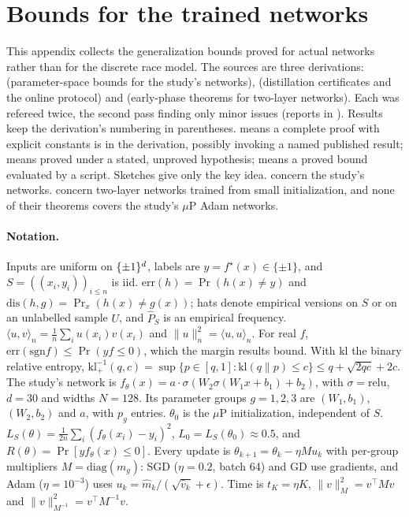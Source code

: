 \section{Bounds for the trained networks}\label{app:networks}

{\sloppy
This appendix collects the generalization bounds proved for actual networks rather than for the discrete race model. The sources are three derivations:
 (parameter-space bounds for the study's networks),
 (distillation certificates and the online protocol) and
 (early-phase theorems for two-layer networks).
Each was refereed twice, the second pass finding only minor issues (reports in ). Results keep the derivation's numbering in parentheses.  means a complete proof with explicit constants is in the derivation, possibly invoking a named published result;  means proved under a stated, unproved hypothesis;  means a proved bound evaluated by a script. Sketches give only the key idea.
 concern the study's networks.  concern two-layer networks trained from small initialization, and none of their theorems covers the study's $\mu$P Adam networks.\par}

\paragraph{Notation.} Inputs are uniform on $\{\pm1\}^d$, labels are $y=f^\star(x)\in\{\pm1\}$, and $S=((x_i,y_i))_{i\le n}$ is iid. $\mathrm{err}(h)=\Pr(h(x)\ne y)$ and $\mathrm{dis}(h,g)=\Pr_x(h(x)\ne g(x))$; hats denote empirical versions on $S$ or on an unlabelled sample $U$, and $\widehat P_S$ is an empirical frequency. $\langle u,v\rangle_n=\frac1n\sum_iu(x_i)v(x_i)$ and $\|u\|_n^2=\langle u,u\rangle_n$. For real $f$, $\mathrm{err}(\mathrm{sgn}f)\le\Pr(yf\le0)$, which the margin results bound. With $\mathrm{kl}$ the binary relative entropy, $\mathrm{kl}^{-1}_+(q,c)=\sup\{p\in[q,1]:\mathrm{kl}(q\|p)\le c\}\le q+\sqrt{2qc}+2c$.
The study's network is $f_\theta(x)=a\cdot\sigma(W_2\sigma(W_1x+b_1)+b_2)$, with $\sigma=\mathrm{relu}$, $d=30$ and widths $N=128$. Its parameter groups $g=1,2,3$ are $(W_1,b_1)$, $(W_2,b_2)$ and $a$, with $p_g$ entries. $\theta_0$ is the $\mu$P initialization, independent of $S$. $L_S(\theta)=\frac1{2n}\sum_i(f_\theta(x_i)-y_i)^2$, $L_0=L_S(\theta_0)\approx0.5$, and $R(\theta)=\Pr[yf_\theta(x)\le0]$. Every update is $\theta_{k+1}=\theta_k-\eta Mu_k$ with per-group multipliers $M=\mathrm{diag}(m_g)$: SGD ($\eta=0.2$, batch 64) and GD use gradients, and Adam ($\eta=10^{-3}$) uses $u_k=\hat m_k/(\sqrt{\hat v_k}+\epsilon)$. Time is $t_K=\eta K$, $\|v\|_M^2=v^\top Mv$ and $\|v\|^2_{M^{-1}}=v^\top M^{-1}v$.

